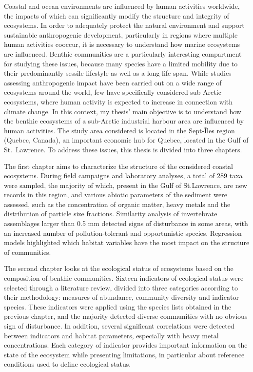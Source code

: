 Coastal and ocean environments are influenced by human activities
worldwide, the impacts of which can significantly modify the structure
and integrity of ecosystems. In order to adequately protect the natural
environment and support sustainable anthropogenic development,
particularly in regions where multiple human activities cooccur, it is
necessary to understand how marine ecosystems are influenced. Benthic
communities are a particularly interesting compartment for studying
these issues, because many species have a limited mobility due to their
predominantly sessile lifestyle as well as a long life span. While
studies assessing anthropogenic impact have been carried out on a wide
range of ecosystems around the world, few have specifically considered
sub-Arctic ecosystems, where human activity is expected to increase in
connection with climate change. In this context, my thesis' main
objective is to understand how the benthic ecosystems of a sub-Arctic
industrial harbour area are influenced by human activities. The study
area considered is located in the Sept-Îles region (Quebec, Canada), an
important economic hub for Quebec, located in the Gulf of St.~Lawrence.
To address these issues, this thesis is divided into three chapters.

The first chapter aims to characterize the structure of the considered
coastal ecosystems. During field campaigns and laboratory analyses, a
total of 289 taxa were sampled, the majority of which, present in the
Gulf of St.Lawrence, are new records in this region, and various abiotic
parameters of the sediment were assessed, such as the concentration of
organic matter, heavy metals and the distribution of particle size
fractions. Similarity analysis of invertebrate assemblages larger than
0.5 mm detected signs of disturbance in some areas, with an increased
number of pollution-tolerant and opportunistic species. Regression
models highlighted which habitat variables have the most impact on the
structure of communities.

The second chapter looks at the ecological status of ecosystems based on
the composition of benthic communities. Sixteen indicators of ecological
status were selected through a literature review, divided into three
categories according to their methodology: measures of abundance,
community diversity and indicator species. These indicators were applied
using the species lists obtained in the previous chapter, and the
majority detected diverse communities with no obvious sign of
disturbance. In addition, several significant correlations were detected
between indicators and habitat parameters, especially with heavy metal
concentrations. Each category of indicator provides important
information on the state of the ecosystem while presenting limitations,
in particular about reference conditions used to define ecological
status.

